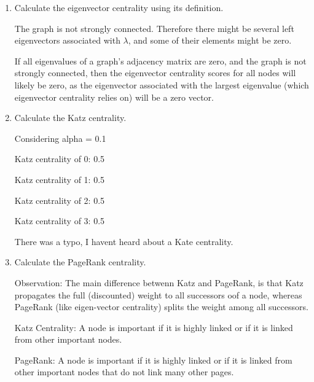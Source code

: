 \documentclass{amsart}
\theoremstyle{definition}
\theoremstyle{remark}
\numberwithin{equation}{section}
\begin{document}
\begin{enumerate}
\begin{enumerate}
\vspace{0.2cm}
\item Calculate the eigenvector centrality using its definition. \vspace{0.2cm}

The graph is not strongly connected. Therefore there might be several left eigenvectors associated with 
$\lambda$, and some of their elements might be zero.

If all eigenvalues of a graph's adjacency matrix are zero, and the graph is not strongly connected, then the eigenvector centrality scores for all nodes will likely be zero, as the eigenvector associated with the largest eigenvalue (which eigenvector centrality relies on) will be a zero vector. 

\vspace{0.2cm}
\item Calculate the Katz centrality. \vspace{0.2cm}

Considering alpha = 0.1

Katz centrality of 0: 0.5

Katz centrality of 1: 0.5

Katz centrality of 2: 0.5

Katz centrality of 3: 0.5


There was a typo, I havent heard about a Kate centrality.
\vspace{0.2cm}
\item Calculate the PageRank centrality. \vspace{0.2cm}


Observation:
The main difference betwenn Katz and PageRank, is that Katz propagates the full (discounted) weight to all successors oof a node, whereas PageRank (like eigen-vector centrality) splits the weight among all successors.

Katz Centrality: A node is important if it is highly linked or if it is linked from other important nodes.

PageRank: A node is important if it is highly linked or if it is linked from other important nodes that do not link many other pages.


\end{enumerate}
\end{enumerate}
\end{document}
